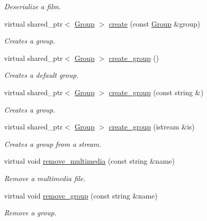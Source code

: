 \begin{DoxyCompactItemize}
\begin{DoxyCompactList}\small\item\em Deserialize a film. \end{DoxyCompactList}\item 
virtual shared\-\_\-ptr$<$ \hyperlink{class_group}{Group} $>$ \hyperlink{class_multimedia_manager_af19f5851053008905770ec23168891c4}{create} (const \hyperlink{class_group}{Group} \&group)
\begin{DoxyCompactList}\small\item\em Creates a group. \end{DoxyCompactList}\item 
virtual shared\-\_\-ptr$<$ \hyperlink{class_group}{Group} $>$ \hyperlink{class_multimedia_manager_a5ebb82c40be17ec58797aaee94fb6238}{create\-\_\-group} ()
\begin{DoxyCompactList}\small\item\em Creates a default group. \end{DoxyCompactList}\item 
virtual shared\-\_\-ptr$<$ \hyperlink{class_group}{Group} $>$ \hyperlink{class_multimedia_manager_a0f9efa126e6f1e43b5256fe54db5f5d1}{create\-\_\-group} (const string \&)
\begin{DoxyCompactList}\small\item\em Creates a group. \end{DoxyCompactList}\item 
virtual shared\-\_\-ptr$<$ \hyperlink{class_group}{Group} $>$ \hyperlink{class_multimedia_manager_ad3b4a69b6dcf13fad2aa016c68fcf357}{create\-\_\-group} (istream \&is)
\begin{DoxyCompactList}\small\item\em Creates a group from a stream. \end{DoxyCompactList}\item 
virtual void \hyperlink{class_multimedia_manager_aaeb480df4f0ef43fe08e820e44006eb9}{remove\-\_\-multimedia} (const string \&name)
\begin{DoxyCompactList}\small\item\em Remove a multimedia file. \end{DoxyCompactList}\item 
virtual void \hyperlink{class_multimedia_manager_a8a6ebd815c8b19b357f2440f943a6dcb}{remove\-\_\-group} (const string \&name)
\begin{DoxyCompactList}\small\item\em Remove a group. \end{DoxyCompactList}\item 

\end{DoxyCompactItemize}
